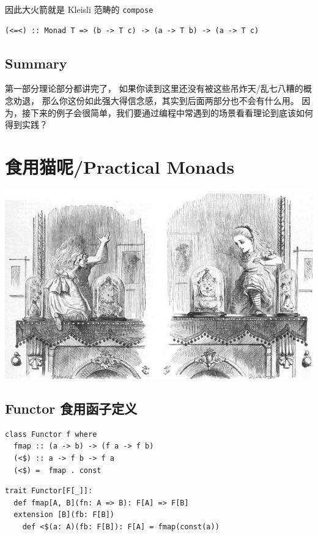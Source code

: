 \documentclass[letterspacing]{tufte-book}
\begin{document}
因此大火箭就是 Kleisli 范畴的 \texttt{compose}

\lstset{language=haskell,label= ,caption= ,captionpos=b,numbers=none}
\begin{lstlisting}
(<=<) :: Monad T => (b -> T c) -> (a -> T b) -> (a -> T c)
\end{lstlisting}

\chapter{Summary}
\label{sec:orgd5dd7d5}
第一部分理论部分都讲完了， 如果你读到这里还没有被这些吊炸天/乱七八糟的概念劝退，
那么你这份如此强大得信念感，其实到后面两部分也不会有什么用。
因为，接下来的例子会很简单，我们要通过编程中常遇到的场景看看理论到底该如何得到实践？

\part{食用猫呢/Practical Monads}
\label{sec:orgee41947}

\begin{center}
\includegraphics[width=.9\linewidth]{./images/Alice_through_the_looking_glass.jpg}
\end{center}

\chapter{Functor 食用函子定义}
\label{sec:org5fdf827}
\lstset{language=haskell,label= ,caption= ,captionpos=b,numbers=none}
\begin{lstlisting}
class Functor f where
  fmap :: (a -> b) -> (f a -> f b)
  (<$) :: a -> f b -> f a
  (<$) =  fmap . const
\end{lstlisting}

\lstset{language=scala,label= ,caption= ,captionpos=b,numbers=none}
\begin{lstlisting}
trait Functor[F[_]]:
  def fmap[A, B](fn: A => B): F[A] => F[B]
  extension [B](fb: F[B])
    def <$(a: A)(fb: F[B]): F[A] = fmap(const(a))
\end{lstlisting}
\end{document}
